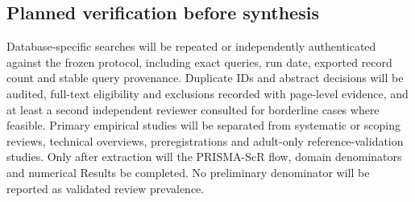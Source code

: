 \subsection{Planned verification before synthesis}

Database-specific searches will be repeated or independently authenticated against the frozen protocol, including exact queries, run date, exported record count and stable query provenance. Duplicate IDs and abstract decisions will be audited, full-text eligibility and exclusions recorded with page-level evidence, and at least a second independent reviewer consulted for borderline cases where feasible. Primary empirical studies will be separated from systematic or scoping reviews, technical overviews, preregistrations and adult-only reference-validation studies. Only after extraction will the PRISMA-ScR flow, domain denominators and numerical Results be completed. No preliminary denominator will be reported as validated review prevalence.
